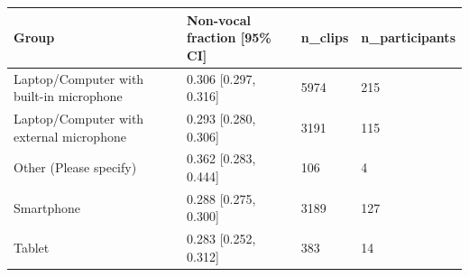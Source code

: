 \begin{tabular}{llll}
\toprule
Group & Non-vocal fraction [95\% CI] & n\_clips & n\_participants \\
\midrule
Laptop/Computer with built-in microphone & 0.306 [0.297, 0.316] & 5974 & 215 \\
Laptop/Computer with external microphone & 0.293 [0.280, 0.306] & 3191 & 115 \\
Other (Please specify) & 0.362 [0.283, 0.444] & 106 & 4 \\
Smartphone & 0.288 [0.275, 0.300] & 3189 & 127 \\
Tablet & 0.283 [0.252, 0.312] & 383 & 14 \\
\bottomrule
\end{tabular}

